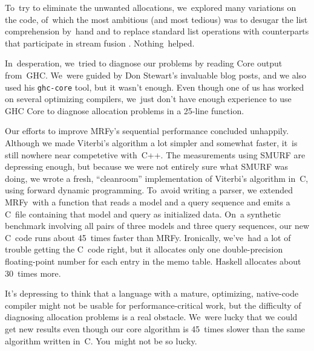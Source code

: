 \documentclass[]{jfp1}
\newcommand\mrfy{MRFy} %
\newif\ifverbatimsmall
\newcommand\smallverbatiminput[1]{%
  \verbatimsmalltrue
  \presvtopsep=\topsep
  \topsep=0.78\topsep
  \verbatimsmallfalse
  \topsep=\presvtopsep
}
\let\cite\citep
\begin{document}
\begin{itemize}
To~try to eliminate the unwanted allocations,
we~explored many variations on the code, of~which the most ambitious (and
most tedious) was to desugar the list comprehension by~hand and to
replace standard list operations with counterparts that participate
in stream fusion \cite{coutts:fusion}.
Nothing~helped.
\end{itemize}
In~desperation, we~tried to diagnose our problems by reading 
Core output from~GHC.
We~were guided by Don Stewart's invaluable blog posts,
and we also used his \texttt{ghc-core} tool, 
but it wasn't enough.
Even though one of us has worked on several optimizing compilers, 
we~just don't have enough experience to use GHC Core to diagnose
allocation problems in a 25-line function.










Our efforts to improve \mrfy's sequential
performance concluded unhappily.
Although we made Viterbi's algorithm a lot simpler and somewhat
faster, it~is still nowhere near competetive with~C++.
The measurements using SMURF are depressing enough, but because we were
not entirely sure what SMURF was doing, we wrote a fresh,
``cleanroom'' implementation of Viterbi's algorithm in~C, using
forward dynamic programming.
To~avoid writing a parser, we extended \mrfy\ with a function that reads a
model and a query sequence and emits a C~file containing that model
and query as initialized data.
On~a synthetic benchmark involving all pairs of three models and three
query sequences, our new C~code runs about 45~times faster than \mrfy.
Ironically, we've~had a lot of trouble getting the C~code right, but it
allocates only one double-precision floating-point number for each
entry in the memo table.
Haskell allocates about 30~times more.

It's depressing to think that a language with a mature, optimizing,
native-code compiler might not be usable for performance-critical
work, but the difficulty of diagnosing allocation problems is a real
obstacle.
We~were lucky that we could get new results
even though our core algorithm is 45~times slower than the
same algorithm written in~C.
You~might not be so lucky.
\end{document}
